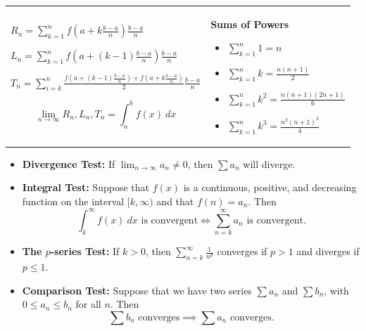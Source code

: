 \documentclass{article}
\newenvironment{bx}[1][]{
\begin{tcolorbox}[colback=white!97!black, title=#1, arc=0in, halign=flush left, left=1mm, right=1mm,]
}{
\end{tcolorbox}
}
\begin{document}
\begin{multicols}{2}
\begin{bx}[Riemann Sums]
\begin{tabular}{p{155pt} | p{100pt}}
    $ R_n=\sum_{k=1}^{n}f\left(a+k\frac{b-a}{n}\right)\frac{b-a}{n}$ 

$ L_n=\sum_{k=1}^{n}f\left(a+(k-1)\frac{b-a}{n}\right)\frac{b-a}{n}$ 

$ T_n=\sum_{i=k}^{n}\frac{f\left(a+(k-1)\frac{b-a}{n}\right)+f\left(a+k\frac{b-a}{n}\right)}{2}\frac{b-a}{n}$

$$\lim_{n\to\infty}R_n,L_n,T_n=\int_a^bf(x)\ dx$$

& 
\textbf{Sums of Powers}

\begin{itemize}[leftmargin=0.75em]
    \item $\sum_{k=1}^n 1 = n $
    \item $\sum_{k=1}^n k = \frac{n(n+1)}{2}$
    \item $\sum_{k=1}^n k^2 = \frac{n(n+1)(2n+1)}{6}$
    \item $\sum_{k=1}^n k^3 = \frac{n^2(n+1)^2}{4}$
\end{itemize}
\end{tabular}

\end{bx}



\begin{bx}[Test for Convergence and Divergence]

\begin{itemize}[leftmargin=1em]

\item \textbf{Divergence Test:} If $\displaystyle \lim_{n\to\infty}a_n\neq 0$, then $\sum a_n$ will diverge.\\

\item \textbf{Integral Test:}
Suppose that $f(x)$ is a continuous, positive, and decreasing function on the interval $[k,\infty)$ and that $f(n)=a_n$. Then
$$\int_k^\infty f(x)\ dx\text{ is convergent} \iff \sum_{n=k}^\infty a_n\text{ is convergent}.$$


\item \textbf{The $p$-series Test:}
 If $k>0$, then $\sum_{n=k}^\infty\frac{1}{n^p}$ converges if $p>1$ and diverges if $p\leq 1$.


\item \textbf{Comparison Test:}
 Suppose that we have two series $\sum a_n$ and $\sum b_n$, with $0\leq a_n\leq b_n$ for all $n$. Then
 $$\sum b_n\text{ converges}\implies \sum a_n\text{ converges}.$$



\end{itemize}
\end{bx}
\end{multicols}
\end{document}
